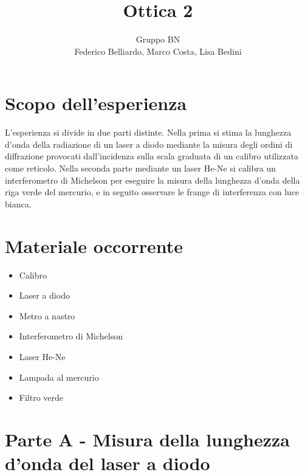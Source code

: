 \documentclass[10pt,a4paper]{article}
\author{Gruppo BN \\ Federico Belliardo, Marco Costa, Lisa Bedini}
\title{Ottica 2}
\begin{document}
\maketitle
\section{Scopo dell'esperienza}
L'esperienza si divide in due parti distinte. Nella prima si stima la lunghezza d'onda della radiazione di un laser a diodo mediante la misura degli ordini di diffrazione provocati dall'incidenza sulla scala graduata di un calibro utilizzata come reticolo. Nella seconda parte mediante un laser He-Ne si calibra un interferometro di Michelson per eseguire la misura della lunghezza d'onda della riga verde del mercurio, e in seguito osservare le frange di interferenza con luce bianca.

\section{Materiale occorrente}
\begin{itemize}
\item Calibro
\item Laser a diodo
\item Metro a nastro
\item Interferometro di Michelson
\item Laser He-Ne
\item Lampada al mercurio
\item Filtro verde
\end{itemize}

\section{Parte A - Misura della lunghezza d'onda del laser a diodo}
\end{document}
